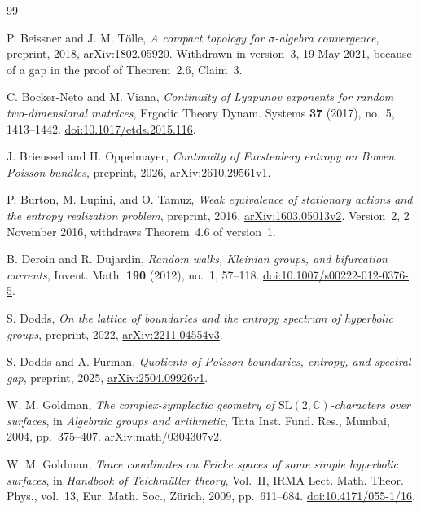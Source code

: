 \documentclass[11pt,letterpaper]{amsart}
\theoremstyle{definition}
\theoremstyle{remark}
\numberwithin{equation}{section}
\begin{document}
\begin{thebibliography}{99}

P. Beissner and J. M. T\"olle,
\emph{A compact topology for $\sigma$-algebra convergence},
preprint, 2018, \href{https://arxiv.org/abs/1802.05920}{arXiv:1802.05920}.
Withdrawn in version~3, 19 May 2021, because of a gap in the proof of
Theorem~2.6, Claim~3.

C. Bocker-Neto and M. Viana,
\emph{Continuity of Lyapunov exponents for random two-dimensional matrices},
Ergodic Theory Dynam. Systems \textbf{37} (2017), no.~5, 1413--1442.
\href{https://doi.org/10.1017/etds.2015.116}{doi:10.1017/etds.2015.116}.

J. Brieussel and H. Oppelmayer,
\emph{Continuity of Furstenberg entropy on Bowen Poisson bundles},
preprint, 2026,
\href{https://arxiv.org/abs/2610.29561v1}{arXiv:2610.29561v1}.

P. Burton, M. Lupini, and O. Tamuz,
\emph{Weak equivalence of stationary actions and the entropy realization problem},
preprint, 2016,
\href{https://arxiv.org/abs/1603.05013v2}{arXiv:1603.05013v2}.
Version~2, 2 November 2016, withdraws Theorem~4.6 of version~1.

B. Deroin and R. Dujardin,
\emph{Random walks, Kleinian groups, and bifurcation currents},
Invent. Math. \textbf{190} (2012), no.~1, 57--118.
\href{https://doi.org/10.1007/s00222-012-0376-5}{doi:10.1007/s00222-012-0376-5}.

S. Dodds,
\emph{On the lattice of boundaries and the entropy spectrum of hyperbolic groups},
preprint, 2022,
\href{https://arxiv.org/abs/2211.04554v3}{arXiv:2211.04554v3}.

S. Dodds and A. Furman,
\emph{Quotients of Poisson boundaries, entropy, and spectral gap},
preprint, 2025,
\href{https://arxiv.org/abs/2504.09926v1}{arXiv:2504.09926v1}.

W. M. Goldman,
\emph{The complex-symplectic geometry of $\mathrm{SL}(2,\mathbb C)$-characters
over surfaces},
in \emph{Algebraic groups and arithmetic}, Tata Inst. Fund. Res.,
Mumbai, 2004, pp.~375--407.
\href{https://arxiv.org/abs/math/0304307v2}{arXiv:math/0304307v2}.

W. M. Goldman,
\emph{Trace coordinates on Fricke spaces of some simple hyperbolic surfaces},
in \emph{Handbook of Teichm\"uller theory}, Vol.~II,
IRMA Lect. Math. Theor. Phys., vol.~13, Eur. Math. Soc.,
Z\"urich, 2009, pp.~611--684.
\href{https://doi.org/10.4171/055-1/16}{doi:10.4171/055-1/16}.


\end{thebibliography}
\end{document}
